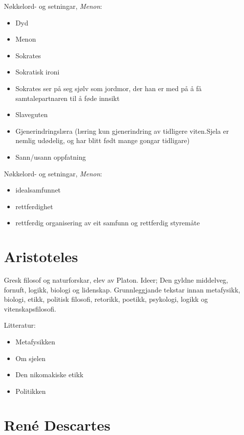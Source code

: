 \documentclass[a4paper]{IEEEtran}
\begin{document}
Nøkkelord- og setningar, \textit{Menon}:
\begin{itemize}
    \bigskip
    
    \item Dyd
    \item Menon
    \item Sokrates
    \item Sokratisk ironi
    \item Sokrates ser på seg sjølv som jordmor, der han er med på å få samtalepartnaren til å føde innsikt
    \item Slaveguten
    \item Gjenerindringslæra (læring kun gjenerindring av tidligere viten.Sjela er nemlig udødelig, og har blitt født mange gongar tidligare)
    \item Sann/usann oppfatning
     
\end{itemize}\bigskip

Nøkkelord- og setningar, \textit{Menon}:
\begin{itemize}
    \bigskip
    
    \item idealsamfunnet
    \item rettferdighet
    \item rettferdig organisering av eit samfunn og rettferdig styremåte
\end{itemize}



\section{Aristoteles}
\label{aristoteles}

Gresk filosof og naturforskar, elev av Platon. Ideer; Den gyldne middelveg, fornuft, logikk, biologi og lidenskap. Grunnleggjande tekstar innan metafysikk, biologi, etikk, politisk filosofi, retorikk, poetikk, psykologi, logikk og vitenskapsfilosofi.
\bigskip

Litteratur:
\begin{itemize}
    \item Metafysikken
    \item Om sjelen
    \item Den nikomakiske etikk
    \item Politikken
\end{itemize}\bigskip 




\newpage
\section{René Descartes}
\label{descartes}
\end{document}
